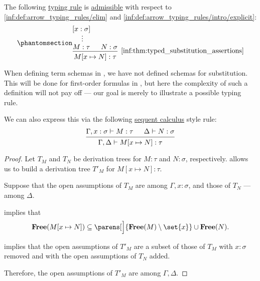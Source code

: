 \begin{proposition}\label{thm:typed_substitution_assertions}
  The following \hyperref[con:typing_rule]{typing rule} is \hyperref[con:inference_rule_admissibility]{admissible} with respect to \ref{inf:def:arrow_typing_rules/elim} and \ref{inf:def:arrow_typing_rules/intro/explicit}:
  \begin{equation*}\taglabel[\ensuremath{ Subst }]{inf:thm:typed_substitution_assertions}
    \begin{prooftree}
      \hypo{ [x: \sigma] }
      \ellipsis {} { M: \tau }

      \hypo{ N: \sigma }
      \infer2[\ref{inf:thm:typed_substitution_assertions}]{ M[x \mapsto N]: \tau }.
    \end{prooftree}
  \end{equation*}
\end{proposition}
\begin{comments}
  \item When defining term schemas in , we have not defined schemas for substitution. This will be done for first-order formulas in , but here the complexity of such a definition will not pay off --- our goal is merely to illustrate a possible typing rule.

  \item We can also express this via the following \hyperref[rem:sequent_calculus]{sequent calculus} style rule:
  \begin{equation*}
    \begin{prooftree}
      \hypo{ \Gamma, x: \sigma \vdash M: \tau }
      \hypo{ \Delta \vdash N: \sigma }
      \infer2{ \Gamma, \Delta \vdash M[x \mapsto N]: \tau }.
    \end{prooftree}
  \end{equation*}
\end{comments}
\begin{proof}
  Let \( T_M \) and \( T_N \) be derivation trees for \( M: \tau \) and \( N: \sigma \), respectively.  allows us to build a derivation tree \( T'_M \) for \( M[x \mapsto N]: \tau \).

  Suppose that the open assumptions of \( T_M \) are among \( \Gamma, x: \sigma \), and those of \( T_N \) --- among \( \Delta \).

   implies that
  \begin{equation*}
    \op*{Free}(M[x \mapsto N]) \subseteq \parens[\Big]{ \op*{Free}(M) \setminus \set{ x } } \cup \op*{Free}(N).
  \end{equation*}

   implies that the open assumptions of \( T'_M \) are a subset of those of \( T_M \) with \( x: \sigma \) removed and with the open assumptions of \( T_N \) added.

  Therefore, the open assumptions of \( T'_M \) are among \( \Gamma, \Delta \).
\end{proof}

